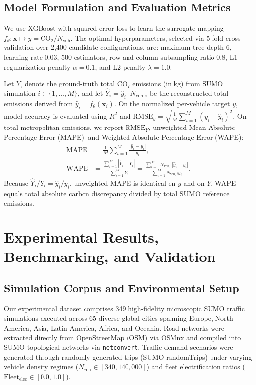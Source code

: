 \documentclass[journal]{IEEEtran}
\begin{document}
\subsection{Model Formulation and Evaluation Metrics}
\label{subsec:metrics}
We use XGBoost \cite{Chen2016} with squared-error loss to learn the surrogate mapping $f_\theta: \mathbf{x} \mapsto y = \text{CO}_2 / N_{\text{veh}}$. The optimal hyperparameters, selected via 5-fold cross-validation over 2,400 candidate configurations, are: maximum tree depth 6, learning rate 0.03, 500 estimators, row and column subsampling ratio 0.8, L1 regularization penalty $\alpha = 0.1$, and L2 penalty $\lambda = 1.0$.

Let $Y_i$ denote the ground-truth total $\text{CO}_2$ emissions (in kg) from SUMO simulation $i \in \{1, \dots, M\}$, and let $\hat{Y}_i = \hat{y}_i \cdot N_{\text{veh}, i}$ be the reconstructed total emissions derived from $\hat{y}_i = f_\theta(\mathbf{x}_i)$.
On the normalized per-vehicle target $y$, model accuracy is evaluated using $R^2$ and $\text{RMSE}_y = \sqrt{\frac{1}{M} \sum_{i=1}^M (y_i - \hat{y}_i)^2}$.
On total metropolitan emissions, we report $\text{RMSE}_Y$, unweighted Mean Absolute Percentage Error (MAPE), and Weighted Absolute Percentage Error (WAPE):
\begin{equation}
\begin{aligned}
\text{MAPE} &= \frac{1}{M} \sum_{i=1}^M \frac{|\hat{y}_i - y_i|}{y_i}, \\
\text{WAPE} &= \frac{\sum_{i=1}^M |\hat{Y}_i - Y_i|}{\sum_{i=1}^M Y_i} = \frac{\sum_{i=1}^M N_{\text{veh}, i} |\hat{y}_i - y_i|}{\sum_{i=1}^M N_{\text{veh}, i} y_i}.
\end{aligned}
\label{eq:metrics_def}
\end{equation}
Because $\hat{Y}_i / Y_i = \hat{y}_i / y_i$, unweighted MAPE is identical on $y$ and on $Y$. WAPE equals total absolute carbon discrepancy divided by total SUMO reference emissions.

\section{Experimental Results, Benchmarking, and Validation}

\subsection{Simulation Corpus and Environmental Setup}
Our experimental dataset comprises 349 high-fidelity microscopic SUMO traffic simulations executed across 65 diverse global cities spanning Europe, North America, Asia, Latin America, Africa, and Oceania. Road networks were extracted directly from OpenStreetMap (OSM) via OSMnx \cite{Boeing2017} and compiled into SUMO topological networks via \texttt{netconvert}. Traffic demand scenarios were generated through randomly generated trips (SUMO randomTrips) under varying vehicle density regimes ($N_{\text{veh}} \in [340, 140,000]$) and fleet electrification ratios ($\text{Fleet}_{\text{elec}} \in [0.0, 1.0]$).
\end{document}
